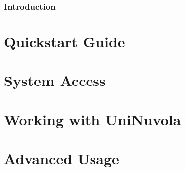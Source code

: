 \documentclass[a4paper,11pt]{article}
\begin{document}


\tableofcontents
\newpage

\section*{Introduction}


\pagebreak
\part{Quickstart Guide}


\pagebreak
\part{System Access}

\pagebreak
\part{Working with UniNuvola}

\pagebreak
\part{Advanced Usage}

\end{document}

